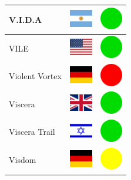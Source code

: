\documentclass[12pt, a4paper, twoside]{report}
\begin{document}
\begin{center}
\begin{longtable}{|p{5cm}|p{2cm}|p{2cm}|}
 V.I.D.A                                                    & \includegraphics[width=1cm]{../4x3/ar} &   \includegraphics[width=1cm]{../likes/y} \\ \hline
 VILE                                                       & \includegraphics[width=1cm]{../4x3/us} &   \includegraphics[width=1cm]{../likes/y} \\ \hline
 Violent Vortex                                             & \includegraphics[width=1cm]{../4x3/de} &   \includegraphics[width=1cm]{../likes/n} \\ \hline
 Viscera                                                    & \includegraphics[width=1cm]{../4x3/gb} &   \includegraphics[width=1cm]{../likes/y} \\ \hline
 Viscera Trail                                              & \includegraphics[width=1cm]{../4x3/il} &   \includegraphics[width=1cm]{../likes/y} \\ \hline
 Visdom                                                     & \includegraphics[width=1cm]{../4x3/de} &   \includegraphics[width=1cm]{../likes/m} \\ \hline

\end{longtable}
\end{center}
\end{document}

